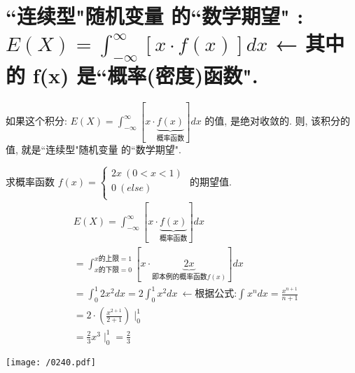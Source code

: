 \documentclass[UTF8]{ctexart}
\begin{document}
	






\section{``连续型"随机变量 的``数学期望" : $E(X)=\int_{-\infty}^{\infty}{\left[ x\cdot f\left( x \right) \right] dx}	$  ← 其中的 f(x) 是``概率(密度)函数".}

如果这个积分: $ \boxed{	E(X)=\int_{-\infty}^{\infty}{\left[ x\cdot \underset{\text{概率函数}}{\underbrace{f\left( x \right) }} \right] dx}}$ 的值, 是绝对收敛的. 则, 该积分的值, 就是``连续型"随机变量 的``数学期望". \\



\begin{myEnvSample}
	求概率函数 $
	f(x)=\left\{ \begin{array}{l}
		2x\ (0<x<1)\\
		0\ (else)\\
	\end{array} \right. 
	$ 的期望值. \\
	
	\begin{align*}  %
	& E(X)=\int_{-\infty}^{\infty}{\left[ x\cdot \underset{\text{概率函数}}{\underbrace{f\left( x \right) }} \right] dx}\\
& =\int_{x\text{的下限}=0}^{x\text{的上限}=1}{\left[ x\cdot \underset{\text{即本例的概率函数}f(x)}{\underbrace{2x}} \right]}dx\\
& =\int_0^1{2x^2}dx=2\int_0^1{x^2}dx\ \gets \text{根据公式:}\int_{}^{}{x^n}dx=\frac{x^{n+1}}{n+1}\\
& =2\cdot \left( \frac{x^{2+1}}{2+1} \right) \mid_{0}^{1} \\
& =\frac{2}{3}x^3\mid_{0}^{1}=\frac{2}{3}
	\end{align*}

\texttt{[image: /0240.pdf]} 
\end{myEnvSample}
\vspace{1em} 
\end{document}
